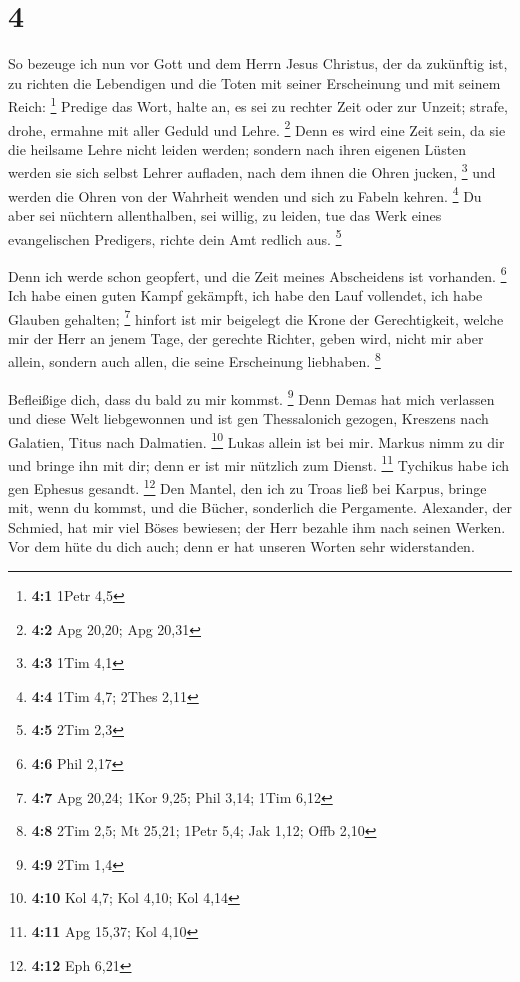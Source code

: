 \hypertarget{section-1}{%
\section{4}\label{section-1}}

 So bezeuge ich nun vor Gott und dem Herrn Jesus Christus,
der da zukünftig ist, zu richten die Lebendigen und die Toten mit seiner
Erscheinung und mit seinem Reich: \footnote{\textbf{4:1} 1Petr 4,5}
 Predige das Wort, halte an, es sei zu rechter Zeit oder
zur Unzeit; strafe, drohe, ermahne mit aller Geduld und Lehre.
\footnote{\textbf{4:2} Apg 20,20; Apg 20,31}  Denn es wird
eine Zeit sein, da sie die heilsame Lehre nicht leiden werden; sondern
nach ihren eigenen Lüsten werden sie sich selbst Lehrer aufladen, nach
dem ihnen die Ohren jucken, \footnote{\textbf{4:3} 1Tim 4,1}
 und werden die Ohren von der Wahrheit wenden und sich zu
Fabeln kehren. \footnote{\textbf{4:4} 1Tim 4,7; 2Thes 2,11}
 Du aber sei nüchtern allenthalben, sei willig, zu leiden,
tue das Werk eines evangelischen Predigers, richte dein Amt redlich aus.
\footnote{\textbf{4:5} 2Tim 2,3}

 Denn ich werde schon geopfert, und die Zeit meines
Abscheidens ist vorhanden. \footnote{\textbf{4:6} Phil 2,17}
 Ich habe einen guten Kampf gekämpft, ich habe den Lauf
vollendet, ich habe Glauben gehalten; \footnote{\textbf{4:7} Apg 20,24;
  1Kor 9,25; Phil 3,14; 1Tim 6,12}  hinfort ist mir
beigelegt die Krone der Gerechtigkeit, welche mir der Herr an jenem
Tage, der gerechte Richter, geben wird, nicht mir aber allein, sondern
auch allen, die seine Erscheinung liebhaben. \footnote{\textbf{4:8} 2Tim
  2,5; Mt 25,21; 1Petr 5,4; Jak 1,12; Offb 2,10}

 Befleißige dich, dass du bald zu mir kommst. \footnote{\textbf{4:9}
  2Tim 1,4}  Denn Demas hat mich verlassen und diese Welt
liebgewonnen und ist gen Thessalonich gezogen, Kreszens nach Galatien,
Titus nach Dalmatien. \footnote{\textbf{4:10} Kol 4,7; Kol 4,10; Kol
  4,14}  Lukas allein ist bei mir. Markus nimm zu dir und
bringe ihn mit dir; denn er ist mir nützlich zum Dienst. \footnote{\textbf{4:11}
  Apg 15,37; Kol 4,10}  Tychikus habe ich gen Ephesus
gesandt. \footnote{\textbf{4:12} Eph 6,21}  Den Mantel,
den ich zu Troas ließ bei Karpus, bringe mit, wenn du kommst, und die
Bücher, sonderlich die Pergamente.  Alexander, der
Schmied, hat mir viel Böses bewiesen; der Herr bezahle ihm nach seinen
Werken.  Vor dem hüte du dich auch; denn er hat unseren
Worten sehr widerstanden.

